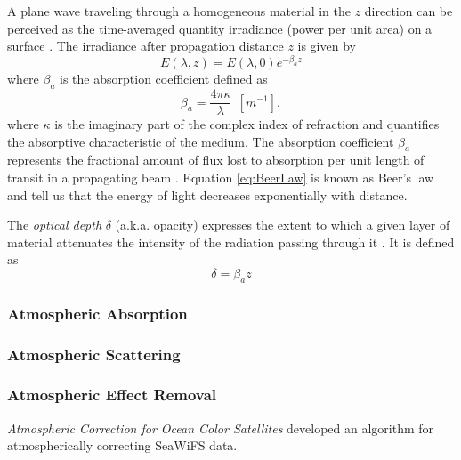 A plane wave traveling through a homogeneous material in the $z$ direction can be perceived as the time-averaged quantity irradiance   (power per unit area) on a surface \cite{Eismann2012}. The irradiance after propagation distance $z$ is given by
\begin{equation}
  \label{eq:BeerLaw}
  E(\lambda,z) = E(\lambda,0)e^{-\beta_a z}
\end{equation}
where $\beta_a$ is the absorption coefficient   defined as
\begin{equation}
  \beta_a = \frac{4\pi \kappa}{\lambda}~~[m^{-1}],
\end{equation}
where $\kappa$ is the imaginary part of the complex index of refraction and quantifies the absorptive characteristic of the medium. The absorption coefficient $\beta_a$ represents the fractional amount of flux lost to absorption per unit length of transit in a propagating beam \cite{Schott}. Equation \ref{eq:BeerLaw} is known as Beer's law  and tell us that the energy of light decreases exponentially with distance.

The {\it optical depth}   $\delta$ (a.k.a. opacity) expresses the extent to which a given layer of material attenuates the intensity of the radiation passing through it \cite{Rees1990}. It is defined as
\begin{equation}
    \delta = \beta_{a}z
\end{equation}



\subsubsection*{Atmospheric Absorption}

\subsubsection*{Atmospheric Scattering}

\subsubsection*{Atmospheric Effect Removal}

{\it Atmospheric Correction for Ocean Color Satellites }
\cite{Gordon:1994} developed an algorithm for atmospherically correcting SeaWiFS data.


